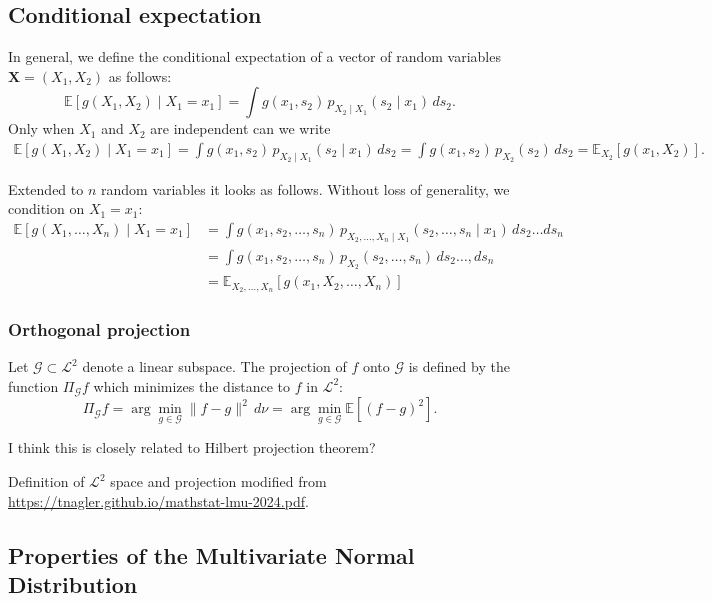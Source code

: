 \subsection{Conditional expectation}
In general, we define the conditional expectation of a vector of random variables $\boldsymbol{X} = (X_1, X_2)$ as follows:
\[
\mathbb{E}[g(X_1, X_2) \mid X_1 = x_1] = \int g(x_1, s_2) \, p_{X_2 \mid X_1}(s_2 \mid x_1) \, ds_2.
\]
Only when $X_1$ and $X_2$ are independent can we write
\begin{align*}
    \mathbb{E}[g(X_1, X_2) \mid X_1 = x_1] = \int g(x_1, s_2) \, p_{X_2 \mid X_1}(s_2 \mid x_1) \, ds_2 = \int g(x_1, s_2) \, p_{X_2}(s_2) \, ds_2 = \mathbb{E}_{X_2}[g(x_1, X_2)].
\end{align*}

Extended to $n$ random variables it looks as follows. Without loss of generality, we condition on $X_1 = x_1$:
\begin{align*}
    \mathbb{E}[g(X_1, \dots, X_n) \mid X_1 = x_1] &= \int g(x_1, s_2, \dots, s_n) \, p_{X_2, \dots, X_n \mid X_1}(s_2, \dots, s_n \mid x_1) \, ds_2 \dots ds_n \\
    &= \int g(x_1, s_2, \dots, s_n) \, p_{X_2}(s_2, \dots, s_n) \, ds_2 \dots, ds_n \\
    &= \mathbb{E}_{X_2, \dots, X_n}[g(x_1, X_2, \dots, X_n)]
\end{align*}


\subsubsection*{Orthogonal projection}
Let $\mathcal{G} \subset \mathcal{L}^2$ denote a linear subspace. The projection of $f$ onto $\mathcal{G}$ is defined by the function $\Pi_{\mathcal{G}}f$ which minimizes the distance to $f$ in $\mathcal{L}^2$:
\[
\Pi_{\mathcal{G}}f = \arg\min_{g \in \mathcal{G}} \|f - g\|^2 \, d\nu
= \arg\min_{g \in \mathcal{G}} \mathbb{E}[(f - g)^2].
\]

{\color{blue}I think this is closely related to Hilbert projection theorem?}\par
Definition of $\mathcal{L}^2$ space and projection modified from \href{https://tnagler.github.io/mathstat-lmu-2024.pdf}{https://tnagler.github.io/mathstat-lmu-2024.pdf}.


\subsection*{Properties of the Multivariate Normal Distribution}

